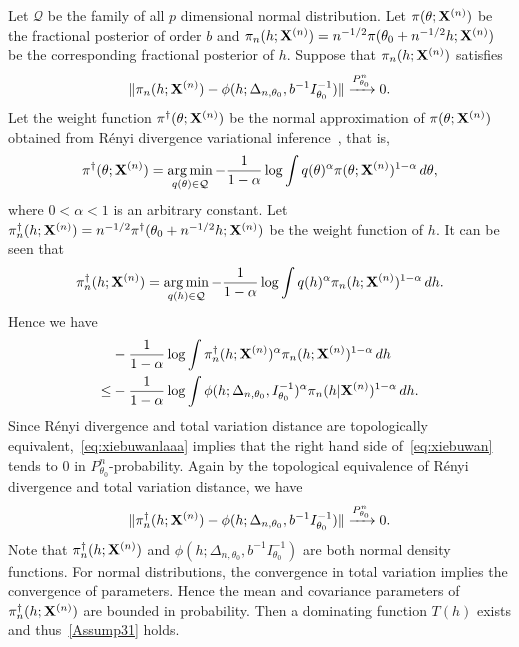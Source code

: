 \documentclass[11pt]{article}
\DeclareMathOperator*{\argmin}{arg\,min}
\theoremstyle{plain}
\theoremstyle{definition}
\theoremstyle{remark}
\begin{document}
Let $\mathcal{Q}$ be the family of all $p$ dimensional normal distribution.
Let $\pi(\theta;\mathbf{X}^{(n)})$ be the fractional posterior of order $b$ and $\pi_n(h;\mathbf{X}^{(n)})=n^{-1/2}\pi(\theta_0+n^{-1/2}h;\mathbf{X}^{(n)})$ be the corresponding fractional posterior of $h$.
Suppose that $\pi_n(h;\mathbf{X}^{(n)})$ satisfies
\begin{equation}\label{eq:xiebuwanlaaa}
    \|\pi_n(h;\mathbf{X}^{(n)})-\phi(h;\Delta_{n,\theta_0},b^{-1}I_{\theta_0}^{-1})\| \xrightarrow{P_{\theta_0}^n}0.
\end{equation}
Let the weight function $\pi^{\dagger}(\theta;\mathbf{X}^{(n)})$ be the normal approximation of $\pi(\theta;\mathbf{X}^{(n)})$ obtained from R\'{e}nyi divergence variational inference~\citep{NIPS2016_6208}, that is,
    $$
    \pi^{\dagger}(\theta;\BX^{(n)})=\argmin_{q(\theta)\in\mathcal{Q}} -\frac{1}{1-\alpha} \log \int q(\theta)^{\alpha} \pi(\theta;\BX^{(n)})^{1-\alpha}\, d\theta,
    $$
    where $0<\alpha<1$ is an arbitrary constant.
    Let $\pi_n^{\dagger}(h;\mathbf{X}^{(n)})=n^{-1/2}\pi^{\dagger}(\theta_0+n^{-1/2}h;\mathbf{X}^{(n)})$ be the weight function of $h$.
    It can be seen that
    $$
    \pi_n^{\dagger}(h;\BX^{(n)})=\argmin_{q(h)\in\mathcal{Q}} -\frac{1}{1-\alpha} \log \int q(h)^{\alpha} \pi_n(h;\BX^{(n)})^{1-\alpha}\, dh.
    $$
    Hence we have
    \begin{equation}\label{eq:xiebuwan}
        \begin{split}
        &-\frac{1}{1-\alpha} \log \int \pi^{\dagger}_n(h;\mathbf{X}^{(n)})^{\alpha} \pi_n(h;\mathbf{X}^{(n)})^{1-\alpha}\, dh
        \\
    \leq&
    -\frac{1}{1-\alpha} \log \int \phi(h;\Delta_{n,\theta_0}, I_{\theta_0}^{-1})^{\alpha} \pi_n(h|\mathbf{X}^{(n)})^{1-\alpha}\, dh.
        \end{split}
    \end{equation}
    Since R\'{e}nyi divergence and total variation distance are topologically equivalent,~\eqref{eq:xiebuwanlaaa} implies that the right hand side of~\eqref{eq:xiebuwan} tends to $0$ in $P_{\theta_0}^n$-probability.
    Again by the topological equivalence of R\'{e}nyi divergence and total variation distance, we have
\begin{equation*}
    \|\pi_n^{\dagger}(h;\mathbf{X}^{(n)})-\phi(h;\Delta_{n,\theta_0},b^{-1}I_{\theta_0}^{-1})\| \xrightarrow{P_{\theta_0}^n}0.
\end{equation*}
Note that $\pi_n^{\dagger}(h;\mathbf{X}^{(n)})$ and $\phi(h;\Delta_{n,\theta_0},b^{-1}I_{\theta_0}^{-1})$ are both normal density functions.
For normal distributions, the convergence in total variation implies the convergence of parameters.
Hence the mean and covariance parameters of $\pi_n^{\dagger}(h;\mathbf{X}^{(n)})$ are bounded in probability.
    Then a dominating function $T(h)$ exists and thus~\eqref{Assump31} holds.
\end{document}
